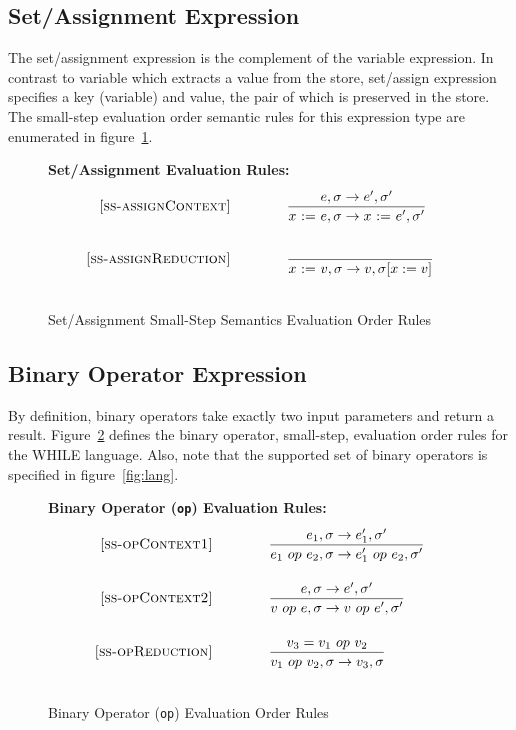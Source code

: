 \documentclass{article}
\newcommand{\assign}[2]{#1~{:=}~#2}
\begin{document}
\subsection{Set/Assignment Expression}

The set/assignment expression is the complement of the variable expression.  In contrast to variable which extracts a value from the store, set/assign expression specifies a key (variable) and value, the pair of which is preserved in the store.  The small-step evaluation order semantic rules for this expression type are enumerated in figure~\ref{fig:assignRules}.

\begin{figure}[H]
\caption{Set/Assignment Small-Step Semantics Evaluation Order Rules}
\label{fig:assignRules}
{\bf Set/Assignment Evaluation Rules:} 
\[
\\
\begin{array}{r@{\qquad\qquad}l}
\ssrule{ss-assignContext}{
  \sstep{e}{\sigma}{e'}{\sigma'}
}{
  \sstep{\assign{x}{e}}{\sigma}{\assign{x}{e'}}{\sigma'}
}
\ssrule{ss-assignReduction}{
}{
  \sstep{\assign{x}{v}}{\sigma}{v}{\sigma[x:=v]}
}
\end{array}
\]
\end{figure}

\subsection{Binary Operator Expression}

By definition, binary operators take exactly two input parameters and return a result.  Figure~\ref{fig:opRules} defines the binary operator, small-step, evaluation order rules for the WHILE language.  Also, note that the supported set of binary operators is specified in figure~\ref{fig:lang}.  

\begin{figure}[H]
\caption{Binary Operator ({\tt op}) Evaluation Order Rules}
\label{fig:opRules}
{\bf Binary Operator ({\tt op}) Evaluation Rules:}
\[
\\
\begin{array}{r@{\qquad\qquad}l}
\ssrule{ss-opContext1}{
  \sstep{e_1}{\sigma}{e_1'}{\sigma'}
}{
  \sstep{e_1~op~e_2}{\sigma}{e_1'~op~e_2}{\sigma'}
}
\ssrule{ss-opContext2}{
  \sstep{e}{\sigma}{e'}{\sigma'}
}{
  \sstep{v~op~e}{\sigma}{v~op~e'}{\sigma'}
}
\ssrule{ss-opReduction}{
  v_3 = v_1 ~op~ v_2
}{
  \sstep{v_1~op~v_2}{\sigma}{v_3}{\sigma}
}
\end{array}
\]
\end{figure}
\end{document}
